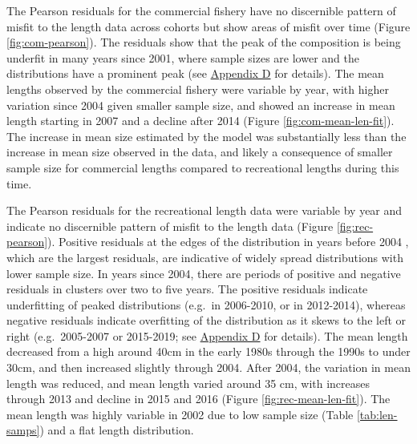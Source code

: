 \documentclass[11pt,
  english,
  letterpaper,
]{article}
\begin{document}
\leavevmode\tagmcend\tagstructend\par


The Pearson residuals for the commercial fishery have no discernible pattern of misfit to the length data across cohorts but show areas of misfit over time (Figure \ref{fig:com-pearson}). The residuals show that the peak of the composition is being underfit in many years since 2001, where sample sizes are lower and the distributions have a prominent peak (see {\protect\hyperlink{append_d}{Appendix D}\leavevmode\tagmcend\tagstructend} for details). The mean lengths observed by the commercial fishery were variable by year, with higher variation since 2004 given smaller sample size, and showed an increase in mean length starting in 2007 and a decline after 2014 (Figure \ref{fig:com-mean-len-fit}). The increase in mean size estimated by the model was substantially less than the increase in mean size observed in the data, and likely a consequence of smaller sample size for commercial lengths compared to recreational lengths during this time.

\leavevmode\tagmcend\tagstructend\par


The Pearson residuals for the recreational length data were variable by year and indicate no discernible pattern of misfit to the length data (Figure \ref{fig:rec-pearson}). Positive residuals at the edges of the distribution in years before 2004 , which are the largest residuals, are indicative of widely spread distributions with lower sample size. In years since 2004, there are periods of positive and negative residuals in clusters over two to five years. The positive residuals indicate underfitting of peaked distributions (e.g.~in 2006-2010, or in 2012-2014), whereas negative residuals indicate overfitting of the distribution as it skews to the left or right (e.g.~2005-2007 or 2015-2019; see {\protect\hyperlink{append_d}{Appendix D}\leavevmode\tagmcend\tagstructend} for details). The mean length decreased from a high around 40cm in the early 1980s through the 1990s to under 30cm, and then increased slightly through 2004. After 2004, the variation in mean length was reduced, and mean length varied around 35 cm, with increases through 2013 and decline in 2015 and 2016 (Figure \ref{fig:rec-mean-len-fit}). The mean length was highly variable in 2002 due to low sample size (Table \ref{tab:len-samps}) and a flat length distribution.
\end{document}
